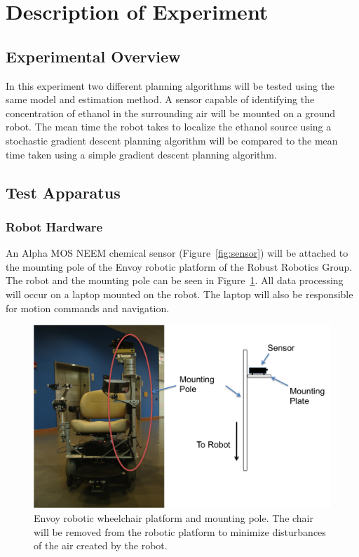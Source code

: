 \documentclass[submit]{aiaa-pretty-modified}
\begin{document}
\section{Description of Experiment}
\subsection{Experimental Overview}
In this experiment two different planning algorithms will be tested using the
same model and estimation method. A sensor capable of identifying the
concentration of ethanol in the surrounding air will be mounted on a ground
robot. The mean time the robot takes to localize the ethanol source using a
stochastic gradient descent planning algorithm will be compared to the mean time
taken using a simple gradient descent planning algorithm.

\subsection{Test Apparatus}
\label{sec:design}
\subsubsection{Robot Hardware}

An Alpha MOS NEEM chemical sensor (Figure~\ref{fig:sensor}) will be attached to
the mounting pole of the Envoy robotic platform of the Robust Robotics Group.
The robot and the mounting pole can be seen in Figure~\ref{fig:wheelchair}. All
data processing will occur on a laptop mounted on the robot. The laptop will
also be responsible for motion commands and navigation.

\begin{figure}
\begin{center}
\includegraphics[width=5in]{img/wheelchair.pdf}
\caption{Envoy robotic wheelchair platform and mounting pole. The chair will be
  removed from the robotic platform to minimize disturbances of the air created
  by the robot.}
\label{fig:wheelchair}
\end{center}
\end{figure}
\end{document}
